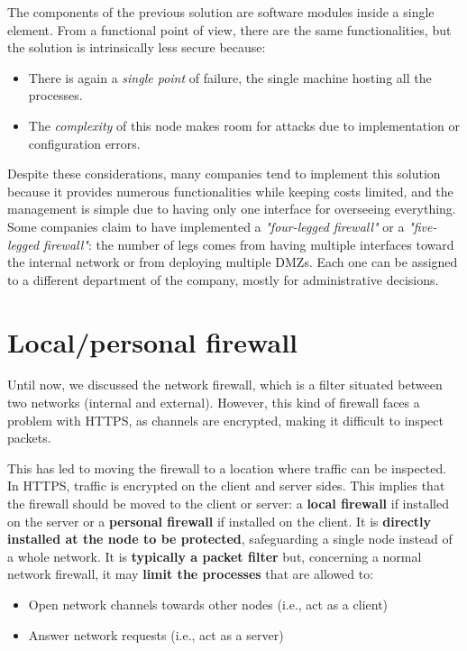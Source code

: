 The components of the previous solution are software modules inside a single element. From a functional point of view, there are the same functionalities, but the solution is intrinsically less secure because:

\begin{itemize}
    \item There is again a \textit{single point} of failure, the single machine hosting all the processes.
    \item The \textit{complexity} of this node makes room for attacks due to implementation or configuration errors.
\end{itemize}

Despite these considerations, many companies tend to implement this solution because it provides numerous functionalities while keeping costs limited, and the management is simple due to having only one interface for overseeing everything. Some companies claim to have implemented a \textit{"four-legged firewall"} or a \textit{"five-legged firewall"}: the number of legs comes from having multiple interfaces toward the internal network or from deploying multiple DMZs. Each one can be assigned to a different department of the company, mostly for administrative decisions.


\section{Local/personal firewall}

Until now, we discussed the network firewall, which is a filter situated between two networks (internal and external). However, this kind of firewall faces a problem with HTTPS, as channels are encrypted, making it difficult to inspect packets.

This has led to moving the firewall to a location where traffic can be inspected. In HTTPS, traffic is encrypted on the client and server sides. This implies that the firewall should be moved to the client or server: a \textbf{local firewall} if installed on the server or a \textbf{personal firewall} if installed on the client. It is \textbf{directly installed at the node to be protected}, safeguarding a single node instead of a whole network. It is \textbf{typically a packet filter} but, concerning a normal network firewall, it may \textbf{limit the processes} that are allowed to:
\begin{itemize}
    \item Open network channels towards other nodes (i.e., act as a client)
    \item Answer network requests (i.e., act as a server)
\end{itemize}

